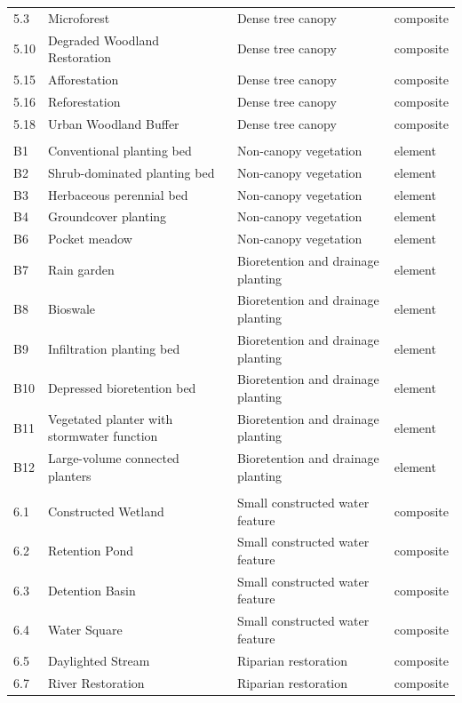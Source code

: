 {\begin{longtable}{@{}l>{\raggedright\arraybackslash}p{52mm}
                    >{\raggedright\arraybackslash}p{42mm}l@{}}
5.3 & Microforest & Dense tree canopy & composite \\
5.10 & Degraded Woodland Restoration & Dense tree canopy & composite \\
5.15 & Afforestation & Dense tree canopy & composite \\
5.16 & Reforestation & Dense tree canopy & composite \\
5.18 & Urban Woodland Buffer & Dense tree canopy & composite \\
\addlinespace
\multicolumn{4}{@{}l}{\textit{Ground level} (11)}\\
B1 & Conventional planting bed & Non-canopy vegetation & element \\
B2 & Shrub-dominated planting bed & Non-canopy vegetation & element \\
B3 & Herbaceous perennial bed & Non-canopy vegetation & element \\
B4 & Groundcover planting & Non-canopy vegetation & element \\
B6 & Pocket meadow & Non-canopy vegetation & element \\
B7 & Rain garden & Bioretention and drainage planting & element \\
B8 & Bioswale & Bioretention and drainage planting & element \\
B9 & Infiltration planting bed & Bioretention and drainage planting & element \\
B10 & Depressed bioretention bed & Bioretention and drainage planting & element \\
B11 & Vegetated planter with stormwater function & Bioretention and drainage planting & element \\
B12 & Large-volume connected planters & Bioretention and drainage planting & element \\
\addlinespace
\multicolumn{4}{@{}l}{\textit{Water landscape} (16)}\\
6.1 & Constructed Wetland & Small constructed water feature & composite \\
6.2 & Retention Pond & Small constructed water feature & composite \\
6.3 & Detention Basin & Small constructed water feature & composite \\
6.4 & Water Square & Small constructed water feature & composite \\
6.5 & Daylighted Stream & Riparian restoration & composite \\
6.7 & River Restoration & Riparian restoration & composite \\

\end{longtable}}
